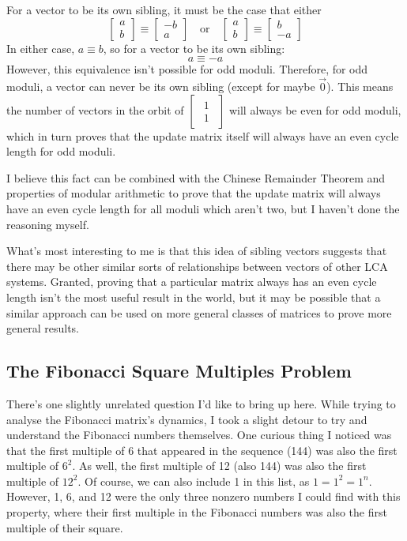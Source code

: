 \documentclass[a4paper, 12pt, reqno]{amsart}
\newcommand{\ssubsection}[1]{\vspace{0.25cm}\subsection{#1}}
\begin{document}
			For a vector to be its own sibling, it must be the case that either
			\[
				\begin{bmatrix}
					a \\
					b
				\end{bmatrix}
				\equiv
				\begin{bmatrix}
					-b \\
					a
				\end{bmatrix}
				\quad \text{or} \quad
				\begin{bmatrix}
					a \\
					b
				\end{bmatrix}
				\equiv
				\begin{bmatrix}
					b \\
					-a
				\end{bmatrix}
			\]
			In either case, $a \equiv b$, so for a vector to be its own sibling:
			\[
				a \equiv -a
			\]
			However, this equivalence isn't possible for odd moduli. Therefore, for odd moduli, a vector can never
			be its own sibling (except for maybe $\vec{0}$). This means the number of vectors in the orbit of
			$
				\begin{bmatrix}
					\begin{smallmatrix}
						1 \\
						1
					\end{smallmatrix}
				\end{bmatrix}
			$
			will always be even for odd moduli, which in turn proves that the update matrix itself will always have
			an even cycle length for odd moduli.
			
			I believe this fact can be combined with the Chinese Remainder Theorem and properties of modular arithmetic
			to prove that the update matrix will always have an even cycle length for all moduli which aren't two, but
			I haven't done the reasoning myself.
			
			What's most interesting to me is that this idea of sibling vectors suggests that there may be other similar
			sorts of relationships between vectors of other LCA systems. Granted, proving that a particular matrix always
			has an even cycle length isn't the most useful result in the world, but it may be possible that a similar
			approach can be used on more general classes of matrices to prove more general results.
		
		\ssubsection{The Fibonacci Square Multiples Problem}
			There's one slightly unrelated question I'd like to bring up here. While trying to analyse the Fibonacci
			matrix's dynamics, I took a slight detour to try and understand the Fibonacci numbers themselves. One 
			curious thing I noticed was that the first multiple of 6 that appeared in the sequence (144) was also the first
			multiple of $6^2$. As well, the first multiple of 12 (also 144) was also the first multiple of $12^2$. 
			Of course, we can also include 1 in this list, as $1 = 1^2 = 1^n$. However, 1, 6, and 12 were the only
			three nonzero numbers I could find with this property, where their first multiple in the Fibonacci numbers was 
			also the first multiple of their square. 
			
\end{document}
